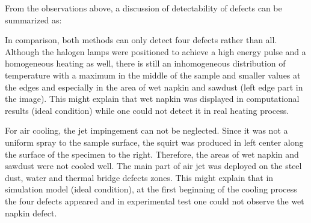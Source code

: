 \documentclass{tQRT2e}
\begin{document}
From the observations above, a discussion of detectability of defects can be summarized as:

In comparison, both methods can only detect four defects rather than all. Although the halogen lamps were positioned to achieve a high energy pulse and a homogeneous heating as well, there is still an inhomogeneous distribution of temperature with a maximum in the middle of the sample and smaller values at the edges and especially in the area of wet napkin and sawdust (left edge part in the image). This might explain that wet napkin was displayed in computational results (ideal condition) while one could not detect it in real heating process. 

For air cooling, the jet impingement can not be neglected. Since it was not a uniform spray to the sample surface, the squirt was produced in left center along the surface of the specimen to the right. Therefore, the areas of wet napkin and sawdust were not cooled well. The main part of air jet was deployed on the steel dust, water and thermal bridge defects zones. This might explain that in simulation model (ideal condition), at the first beginning of the cooling process the four defects appeared and in experimental test one could not observe the wet napkin defect.
\end{document}
